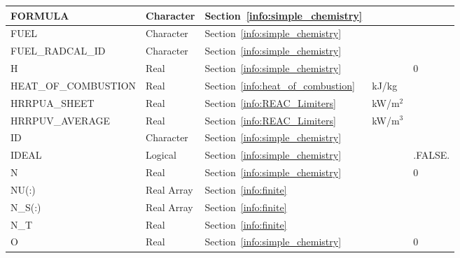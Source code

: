 \documentclass[11pt]{book}
\begin{document}
\begin{longtable}{@{\extracolsep{\fill}}|l|l|l|l|l|}
{\ct FORMULA}                             & Character   & Section~\ref{info:simple_chemistry}       &                   &  \\ \hline
{\ct FUEL}                                & Character   & Section~\ref{info:simple_chemistry}       &                   &   \\ \hline
{\ct FUEL\_RADCAL\_ID}                    & Character   & Section~\ref{info:simple_chemistry}       &                   &       \\ \hline
{\ct H}                                   & Real        & Section~\ref{info:simple_chemistry}       &                   & 0    \\ \hline
{\ct HEAT\_OF\_COMBUSTION}                & Real        & Section~\ref{info:heat_of_combustion}     & kJ/kg             &         \\ \hline
{\ct HRRPUA\_SHEET}                       & Real        & Section~\ref{info:REAC_Limiters}          & kW/m$^2$          &         \\ \hline
{\ct HRRPUV\_AVERAGE}                     & Real        & Section~\ref{info:REAC_Limiters}          & kW/m$^3$          &         \\ \hline
{\ct ID}                                  & Character   & Section~\ref{info:simple_chemistry}       &                   &   \\ \hline
{\ct IDEAL}                               & Logical     & Section~\ref{info:simple_chemistry}       &                   & {\ct .FALSE.}    \\ \hline
{\ct N}                                   & Real        & Section~\ref{info:simple_chemistry}       &                   & 0    \\ \hline
{\ct NU(:)}                               & Real Array  & Section~\ref{info:finite}                 &                   &     \\ \hline
{\ct N\_S(:)}                             & Real Array  & Section~\ref{info:finite}                 &                   &     \\ \hline
{\ct N\_T}                                & Real        & Section~\ref{info:finite}                 &                   &     \\ \hline
{\ct O}                                   & Real        & Section~\ref{info:simple_chemistry}       &                   & 0    \\ \hline

\end{longtable}
\end{document}
